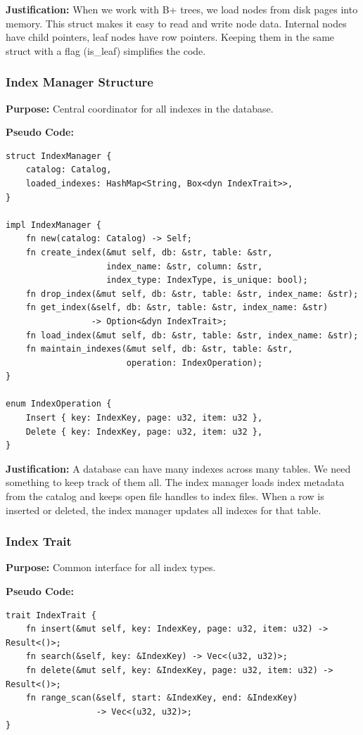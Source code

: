 \documentclass[11pt,a4paper]{article}
\begin{document}
\textbf{Justification:} When we work with B+ trees, we load nodes from disk pages into memory. This struct makes it easy to read and write node data. Internal nodes have child pointers, leaf nodes have row pointers. Keeping them in the same struct with a flag (is\_leaf) simplifies the code.

\subsubsection{Index Manager Structure}

\textbf{Purpose:} Central coordinator for all indexes in the database.

\textbf{Pseudo Code:}
\begin{lstlisting}
struct IndexManager {
    catalog: Catalog,
    loaded_indexes: HashMap<String, Box<dyn IndexTrait>>,
}

impl IndexManager {
    fn new(catalog: Catalog) -> Self;
    fn create_index(&mut self, db: &str, table: &str, 
                    index_name: &str, column: &str,
                    index_type: IndexType, is_unique: bool);
    fn drop_index(&mut self, db: &str, table: &str, index_name: &str);
    fn get_index(&self, db: &str, table: &str, index_name: &str) 
                 -> Option<&dyn IndexTrait>;
    fn load_index(&mut self, db: &str, table: &str, index_name: &str);
    fn maintain_indexes(&mut self, db: &str, table: &str, 
                        operation: IndexOperation);
}

enum IndexOperation {
    Insert { key: IndexKey, page: u32, item: u32 },
    Delete { key: IndexKey, page: u32, item: u32 },
}
\end{lstlisting}

\textbf{Justification:} A database can have many indexes across many tables. We need something to keep track of them all. The index manager loads index metadata from the catalog and keeps open file handles to index files. When a row is inserted or deleted, the index manager updates all indexes for that table.

\subsubsection{Index Trait}

\textbf{Purpose:} Common interface for all index types.

\textbf{Pseudo Code:}
\begin{lstlisting}
trait IndexTrait {
    fn insert(&mut self, key: IndexKey, page: u32, item: u32) -> Result<()>;
    fn search(&self, key: &IndexKey) -> Vec<(u32, u32)>;
    fn delete(&mut self, key: &IndexKey, page: u32, item: u32) -> Result<()>;
    fn range_scan(&self, start: &IndexKey, end: &IndexKey) 
                  -> Vec<(u32, u32)>;
}
\end{lstlisting}
\end{document}
